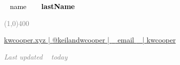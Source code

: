 \documentclass[11pt]{result/cooperCV} %
\begin{document}
	
	

\begin{center}
\HUGE\textcolor{black}{~{{ name }}~}
\HUGE\textcolor{black}{\textbf{~{{ lastName }}~}}
\end{center}

\begin{center}
\textcolor{gray}{\line(1,0){400}}
\end{center}

\begin{center}
\footnotesize 
\href{https://kwcooper.xyz}{\faHome \hspace{0.05cm} kwcooper.xyz | \hspace{0.1cm}}
\href{https://twitter.com/kwcooper}{\faTwitter \hspace{0.05cm} @keilandwcooper | \hspace{0.1cm}} 
\href{mailto: ~{{ email }}~ }{\faEnvelope \hspace{0.05cm} ~{{ email }}~ | \hspace{0.1cm}} 
\href{https://github.com/kwcooper}{\faGithub \hspace{0.05cm} kwcooper} 
\end{center}

\begin{center} \footnotesize \emph{\textcolor{gray}{Last updated ~{{ today }}~}} \end{center}
\vspace{0.7cm}


\end{document}
